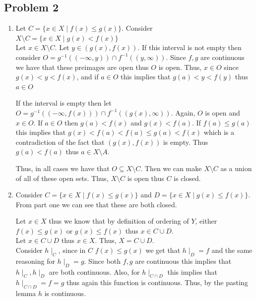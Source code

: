 \documentclass[12pt, letterpaper]{article}
\theoremstyle{definition}
\begin{document}
\subsection*{Problem 2}
\begin{enumerate}
    \item Let $C=\{x \in X \mid f(x) \leq g(x)\}$. Consider $X \setminus C= \{x \in X \mid g(x) < f(x)\}$\\
    Let $x \in X \setminus C$. Let $y \in (g(x),f(x))$. If this interval is not empty then consider $O=g^{-1}((-\infty,y)) \cap f^{-1}((y,\infty))$. Since $f,g$ are continuous we have that these preimages are open thus $O$ is open. Thus, $x \in O$ since $g(x) < y < f(x)$, and if $a \in O$ this implies that $g(a) < y < f(y)$ thus $a \in O$
    
    If the interval is empty then let $O=g^{-1}((-\infty,f(x))) \cap f^{-1}((g(x),\infty))$. Again, $O$ is open and $x \in O$. If $a \in O$ then $g(a) < f(x)$ and $g(x) < f(a)$. If $f(a) \leq g(a)$ this implies that $g(x) < f(a) < f(a) \leq g(a) < f(x)$ which is a contradiction of the fact that $(g(x),f(x))$ is empty. Thus $g(a) < f(a)$ thus $a \in X \setminus A$.

    Thus, in all cases we have that $O \subseteq X \setminus C$. Then we can make $X \setminus C$ as a union of all of these open sets. Thus, $X \setminus C$ is open thus $C$ is closed.

    \item Consider $C=\{x \in X \mid f(x) \leq g(x)\}$ and $D=\{x \in X \mid g(x) \leq f(x)\}$. From part one we can see that these are both closed.
    
    Let $x \in X$ thus we know that by definition of ordering of $Y$, either $f(x) \leq g(x)$ or $g(x) \leq f(x)$ thus $x \in C \cup D$.\\
    Let $x \in C \cup D$ thus $x \in X$. Thus, $X = C \cup D$.\\
    Consider $h \mid_C$, since in $C$ $f(x) \leq g(x)$ we get that $h \mid_D=f$ and the same reasoning for $h \mid_D=g$. Since both $f,g$ are continuous this implies that $h \mid_C,h \mid_D$ are both continuous. Also, for $h \mid_{C \cap D}$ this implies that $h \mid_{C \cap D}=f=g$ thus again this function is continuous. Thus, by the pasting lemma $h$ is continuous.
\end{enumerate}

\newpage
\end{document}
